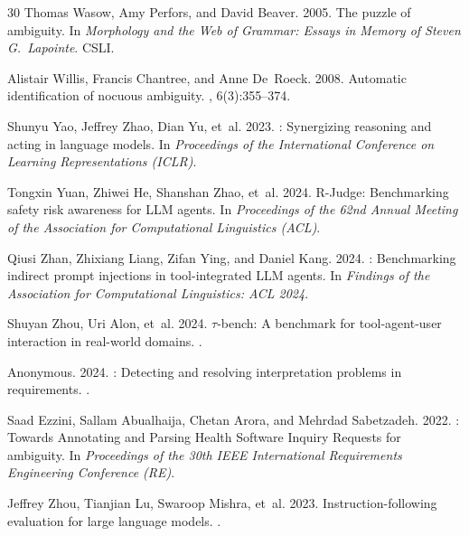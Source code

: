 \documentclass[11pt,a4paper]{article}
\begin{document}
\begin{thebibliography}{30}
Thomas Wasow, Amy Perfors, and David Beaver. 2005.
\newblock The puzzle of ambiguity.
\newblock In {\em Morphology and the Web of Grammar: Essays in Memory of Steven G.\ Lapointe}. CSLI.

Alistair Willis, Francis Chantree, and Anne De~Roeck. 2008.
\newblock Automatic identification of nocuous ambiguity.
, 6(3):355--374.

Shunyu Yao, Jeffrey Zhao, Dian Yu, et~al. 2023.
: Synergizing reasoning and acting in language models.
\newblock In {\em Proceedings of the International Conference on Learning Representations (ICLR)}.

Tongxin Yuan, Zhiwei He, Shanshan Zhao, et~al. 2024.
\newblock R-Judge: Benchmarking safety risk awareness for {LLM} agents.
\newblock In {\em Proceedings of the 62nd Annual Meeting of the Association for Computational Linguistics (ACL)}.

Qiusi Zhan, Zhixiang Liang, Zifan Ying, and Daniel Kang. 2024.
: Benchmarking indirect prompt injections in tool-integrated {LLM} agents.
\newblock In {\em Findings of the Association for Computational Linguistics: ACL 2024}.

Shuyan Zhou, Uri Alon, et~al. 2024.
\newblock $\tau$-bench: A benchmark for tool-agent-user interaction in real-world domains.
.

Anonymous. 2024.
: Detecting and resolving interpretation problems in requirements.
.

Saad Ezzini, Sallam Abualhaija, Chetan Arora, and Mehrdad Sabetzadeh. 2022.
: Towards {A}nnotating and {P}arsing {H}ealth {S}oftware {I}nquiry {R}equests for ambiguity.
\newblock In {\em Proceedings of the 30th IEEE International Requirements Engineering Conference (RE)}.

Jeffrey Zhou, Tianjian Lu, Swaroop Mishra, et~al. 2023.
\newblock Instruction-following evaluation for large language models.
.

\end{thebibliography}
\end{document}
